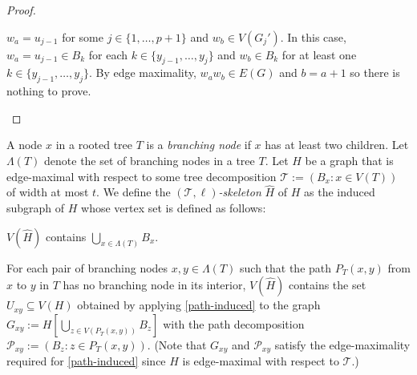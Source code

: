\documentclass[kpfonts]{patmorin}
\newcommand{\defin}[1]{\emph{\color{brightmaroon}#1}}
\theoremstyle{named}
\begin{document}
\begin{proof}
\begin{compactenum}
       \item $w_a = u_{j-1}$ for some $j\in\{1,\ldots,p+1\}$ and $w_b\in V(G_{j}')$.  In this case, $w_a=u_{j-1}\in B_{k}$ for each $k\in\{y_{j-1},\ldots,y_{j}\}$ and $w_b\in B_{k}$ for at least one $k\in\{y_{j-1},\ldots,y_{j}\}$.  By edge maximality, $w_aw_b\in E(G)$ and $b=a+1$ so there is nothing to prove.  \qedhere
    \end{compactenum}
\end{proof}

A node $x$ in a rooted tree $T$ is a \defin{branching node} if $x$ has at least two children.  Let $\Lambda(T)$ denote the set of branching nodes in a tree $T$.  Let $H$ be a graph that is edge-maximal with respect to some tree decomposition $\mathcal{T}:=(B_x:x\in V(T))$ of width at most $t$. We define the \defin{$(\mathcal{T},\ell)$-skeleton} $\hat{H}$ of $H$ as the induced subgraph of $H$ whose vertex set is defined as follows:
\begin{compactenum}
    \item $V(\hat{H})$ contains $\bigcup_{x\in\Lambda(T)} B_x$.

    \item For each pair of branching nodes $x,y\in\Lambda(T)$ such that the path $P_T(x,y)$ from $x$ to $y$ in $T$ has no branching node in its interior, $V(\hat{H})$ contains the set $U_{xy}\subseteq V(H)$ obtained by applying \cref{path-induced} to the graph $G_{xy}:=H[\bigcup_{z\in V(P_T(x,y))} B_z]$ with the path decomposition $\mathcal{P}_{xy}:=(B_z:z\in P_T(x,y))$.  (Note that $G_{xy}$ and $\mathcal{P}_{xy}$ satisfy the edge-maximality required for \cref{path-induced} since $H$ is edge-maximal with respect to $\mathcal{T}$.)
\end{compactenum}
\end{document}
